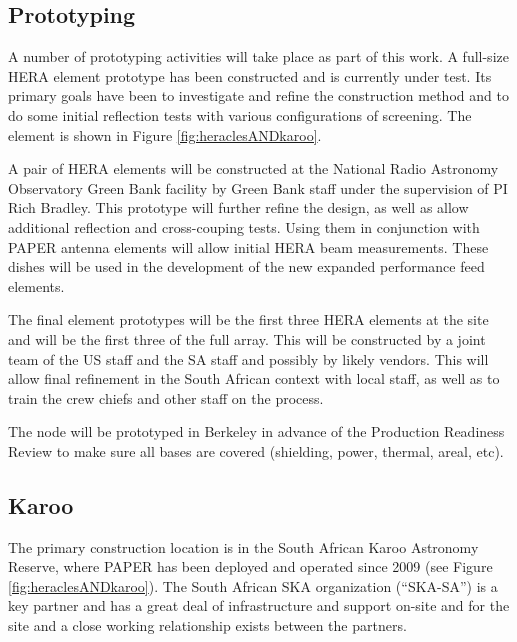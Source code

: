 \documentclass[preprint]{aastex}
\begin{document}
\subsection{Prototyping}
A number of prototyping activities will take place as part of this work.  A full-size HERA element prototype has been
constructed and is currently under test.  Its primary goals have been to investigate and refine the construction
method and to do some initial reflection tests with various configurations of screening.  The element is shown in
Figure \ref{fig:heraclesANDkaroo}.

A pair of HERA elements will be constructed at the National Radio Astronomy Observatory Green Bank
facility by Green Bank staff under the supervision of PI Rich Bradley.  This prototype will further refine
the design, as well as allow additional reflection and cross-couping tests.  Using them in conjunction 
with PAPER antenna elements will allow initial HERA beam measurements.  These dishes will be used
in the development of the new expanded performance feed elements.

The final element prototypes will be the first three HERA elements at the site and will be the first three of the full
array.  This will be constructed by a joint team of the US staff and the SA staff and possibly by likely vendors.
This will allow final refinement in the South African context with local staff, as well as to train the crew chiefs
and other staff on the process.

The node will be prototyped in Berkeley in advance of the Production Readiness Review to make sure
all bases are covered (shielding, power, thermal, areal, etc).  

\subsection{Karoo}
The primary construction location is in the South African Karoo Astronomy Reserve, where PAPER has been deployed
and operated since 2009 (see Figure \ref{fig:heraclesANDkaroo}).  The South African SKA organization (``SKA-SA'') is a key partner and has a great deal of
infrastructure and support on-site and for the site and a close working relationship exists between the partners.
\end{document}
